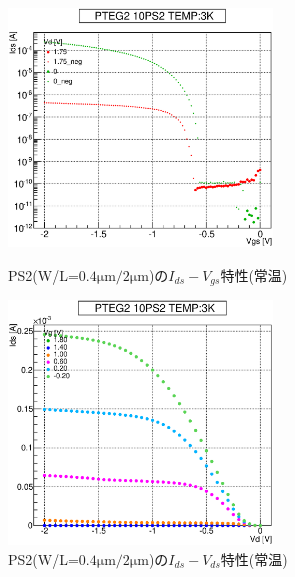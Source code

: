 				\begin{figure}[htbp]
					\begin{minipage}{0.5\hsize}
						\begin{center}
							\includegraphics[width=70mm]{./Chapter/Appendix/Picture/PST/PS2/PTEG2_10_PS2_IdVg_3K.eps}
						\end{center}
						\caption{PS2(W/L=$0.4\mathrm{\mu m}/2\mathrm{\mu m}$)の$I_{ds}-V_{gs}$特性(常温)}
						\label{fig:PS2_IdVg_3K}
					\end{minipage}
					\begin{minipage}{0.5\hsize}
						\begin{center}
							\includegraphics[width=70mm]{./Chapter/Appendix/Picture/PST/PS2/PTEG2_10_PS2_IdVd_3K.eps}
						\end{center}
						\caption{PS2(W/L=$0.4\mathrm{\mu m}/2\mathrm{\mu m}$)の$I_{ds}-V_{ds}$特性(常温)}
						\label{fig:PS2_IdVd_3K}
					\end{minipage}
				\end{figure}
